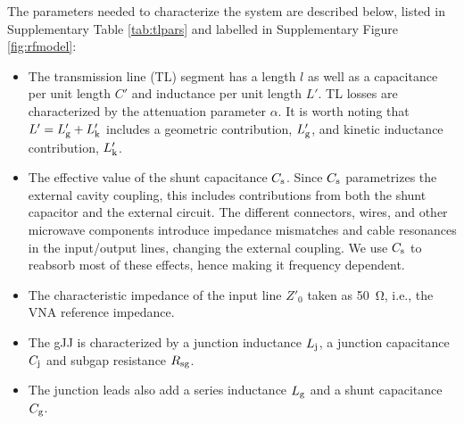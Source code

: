 \documentclass[preprint,
  onecolumn,
  notitlepage,
  amsmath,amssymb,
  aip,
  apl,
]{revtex4-1}
\begin{document}
The parameters needed to characterize the system are described below, listed in Supplementary Table \ref{tab:tlpars} and labelled in Supplementary Figure \ref{fig:rfmodel}:
\begin{itemize}
    \item The transmission line (TL) segment has a length $l$ as well as a capacitance per unit length $C'$ and inductance per unit length $L'$.
    TL losses are characterized by the attenuation parameter $\alpha$.
    It is worth noting that $L' = L'_{\rm g} + L'_{\rm k}$ includes a geometric contribution, $L'_{\rm g}$, and kinetic inductance contribution\cite{vanduzer_principles_1999}, $L'_{\rm k}$.
    \item The effective value of the shunt capacitance $C_{\rm s}$.
    Since $C_{\rm s}$ parametrizes the external cavity coupling, this includes contributions from both the shunt capacitor and the external circuit.
    The different connectors, wires, and other microwave components introduce impedance mismatches and cable resonances in the input/output lines, changing the external coupling.
    We use $C_{\rm s}$ to reabsorb most of these effects, hence making it frequency dependent.
    \item The characteristic impedance of the input line $Z'_0$ taken as \SI{50}{\ohm}, i.e., the VNA reference impedance.
    \item The gJJ is characterized by a junction inductance $L_{\rm j}$, a junction capacitance $C_{\rm j}$ and subgap resistance $R_{\rm sg}$.
    \item The junction leads also add a series inductance $L_{\rm g}$ and a shunt capacitance $C_{\rm g}$.
\end{itemize}
\end{document}
